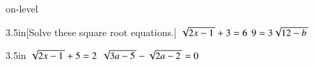 \begin{taggedblock}{on-level}


\begin{my2Problems}[\large]{3.5in}[Solve these square root equations.]
    {
        $ \myRoot{2x-1} + 3 = 6 $
    }
    {
        $ 9 = 3 \myRoot{12-b} $
    }
\end{my2Problems}

\begin{my2Problems}[\large]{3.5in}
    {
        $ \myRoot{2x-1} + 5 = 2 $
    }
    {
        $ \myRoot{3a - 5} - \myRoot{2a -2} = 0 $
    }
\end{my2Problems}



\end{taggedblock}